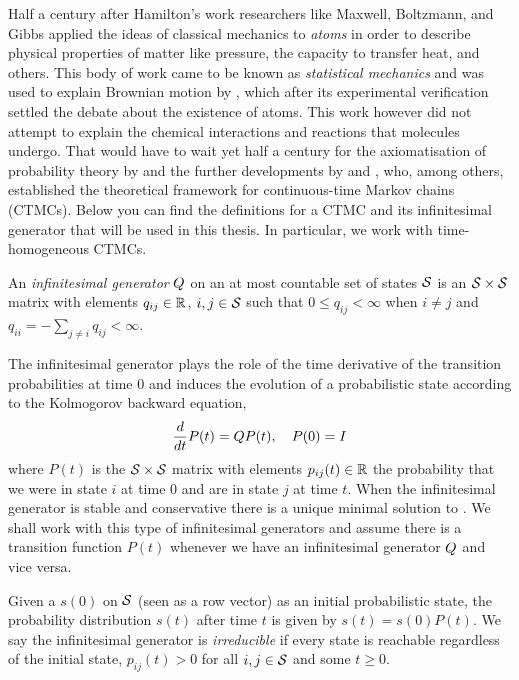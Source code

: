 Half a century after Hamilton's work
researchers like Maxwell, Boltzmann, and Gibbs
applied the ideas of classical mechanics to \emph{atoms}
in order to describe physical properties of matter like pressure,
the capacity to transfer heat, and others.
This body of work came to be known as \emph{statistical mechanics}
and was used to explain Brownian motion by \citet{einstein-brownian},
which after its experimental verification \citep{perrin}
settled the debate about the existence of atoms.
This work however did not attempt to explain
the chemical interactions and reactions that molecules undergo.
That would have to wait yet half a century
for the axiomatisation of probability theory by \citet{kolmogorov}
and the further developments by \citet{doob} and \citet{feller},
who, among others, established the theoretical framework
for continuous-time Markov chains (CTMCs).
Below you can find the definitions for a CTMC
and its infinitesimal generator that will be used in this thesis.
In particular, we work with time-homogeneous CTMCs.

\begin{definition}%
  An \emph{infinitesimal generator} $Q$
  on an at most countable set of states $\mathcal{S}$
  is an $\mathcal{S} \times \mathcal{S}$ matrix
  with elements $q_{ij} \in \mathbb{R}$, $i,j \in \mathcal{S}$
  such that $0 \leqslant q_{ij} < \infty$ when $i \neq j$
  and $q_{ii} = - \sum_{j \neq i} q_{ij} < \infty$.
\end{definition}

The infinitesimal generator plays the role of
the time derivative of the transition probabilities at time $0$
and induces the evolution of a probabilistic state
according to the Kolmogorov backward equation,
\begin{equation}
  \label{eq:transition-function}
  \frac{d}{dt} P(t) = Q P(t), \quad P(0) = I
\end{equation}
where $P(t)$ is the $\mathcal{S} \times \mathcal{S}$ matrix
with elements $p_{ij}(t) \in \mathbb{R}$ the probability that
we were in state $i$ at time $0$ and are in state $j$ at time $t$.
When the infinitesimal generator is stable and conservative
there is a unique minimal solution to 
\citep{anderson}.
We shall work with this type of infinitesimal generators
and assume there is a transition function $P(t)$
whenever we have an infinitesimal generator $Q$ and vice versa.

Given a \pmf $s(0)$ on $\mathcal{S}$ (seen as a row vector)
as an initial probabilistic state,
the probability distribution $s(t)$ after time $t$
is given by $s(t) = s(0) P(t)$.
We say the infinitesimal generator is \emph{irreducible}
if every state is reachable regardless of the initial state,
\ie $p_{ij}(t) > 0$ for all $i,j \in \mathcal{S}$
and some $t \geqslant 0$.

